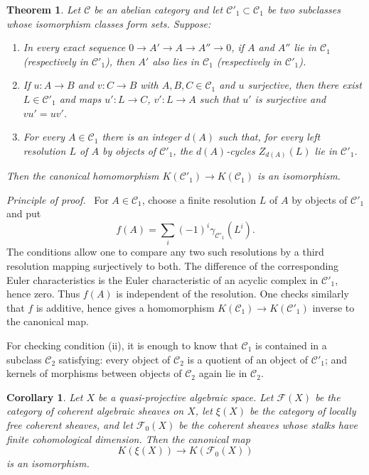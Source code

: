\documentclass[14pt]{extarticle}
\newcommand{\cF}{\mathcal F}
\newcommand{\cC}{\mathcal C}
\newenvironment{prooftext}[1][Proof]{\par\noindent\emph{#1.}\ }{\par\medskip}
\newtheorem*{theorem*}{Theorem}
\newtheorem*{corollary*}{Corollary}
\begin{document}
\begin{theorem*}\label{thm:Kiso}
Let $\cC$ be an abelian category and let $\cC'_1\subset\cC_1$ be two subclasses whose isomorphism classes form sets. Suppose:
\begin{enumerate}[label=(\roman*)]
\item In every exact sequence $0\to A'\to A\to A''\to0$, if $A$ and $A''$ lie in $\cC_1$ (respectively in $\cC'_1$), then $A'$ also lies in $\cC_1$ (respectively in $\cC'_1$).
\item If $u:A\to B$ and $v:C\to B$ with $A,B,C\in\cC_1$ and $u$ surjective, then there exist $L\in\cC'_1$ and maps $u':L\to C$, $v':L\to A$ such that $u'$ is surjective and $vu'=uv'$.
\item For every $A\in\cC_1$ there is an integer $d(A)$ such that, for every left resolution $L$ of $A$ by objects of $\cC'_1$, the $d(A)$-cycles $Z_{d(A)}(L)$ lie in $\cC'_1$.
\end{enumerate}
Then the canonical homomorphism $K(\cC'_1)\to K(\cC_1)$ is an isomorphism.
\end{theorem*}

\begin{prooftext}[Principle of proof]
For $A\in\cC_1$, choose a finite resolution $L$ of $A$ by objects of $\cC'_1$ and put
\[
   f(A)=\sum_i(-1)^i\gamma_{\cC'_1}(L^i).
\]
The conditions allow one to compare any two such resolutions by a third resolution mapping surjectively to both. The difference of the corresponding Euler characteristics is the Euler characteristic of an acyclic complex in $\cC'_1$, hence zero. Thus $f(A)$ is independent of the resolution. One checks similarly that $f$ is additive, hence gives a homomorphism $K(\cC_1)\to K(\cC'_1)$ inverse to the canonical map.
\end{prooftext}

For checking condition (ii), it is enough to know that $\cC_1$ is contained in a subclass $\cC_2$ satisfying: every object of $\cC_2$ is a quotient of an object of $\cC'_1$; and kernels of morphisms between objects of $\cC_2$ again lie in $\cC_2$.

\begin{corollary*}
Let $X$ be a quasi-projective algebraic space. Let $\cF(X)$ be the category of coherent algebraic sheaves on $X$, let $\xi(X)$ be the category of locally free coherent sheaves, and let $\cF_0(X)$ be the coherent sheaves whose stalks have finite cohomological dimension. Then the canonical map
\begin{equation}\label{eq:vectorbundlestoF0}
   K(\xi(X))\to K(\cF_0(X))
\end{equation}
is an isomorphism.
\end{corollary*}
\end{document}
